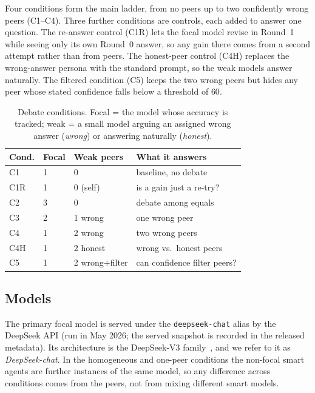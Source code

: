 \documentclass[11pt]{article}
\begin{document}
Four conditions form the main ladder, from no peers up to two confidently
wrong peers (C1--C4).
Three further conditions are controls, each added to answer one question.
The re-answer control (C1R) lets the focal model revise in Round~1 while
seeing only its own Round~0 answer, so any gain there comes from a second
attempt rather than from peers.
The honest-peer control (C4H) replaces the wrong-answer persona with the
standard prompt, so the weak models answer naturally.
The filtered condition (C5) keeps the two wrong peers but hides any peer
whose stated confidence falls below a threshold of $60$.

\begin{table}[t]
\centering
\small
\caption{Debate conditions. Focal = the model whose accuracy is tracked;
weak = a small model arguing an assigned wrong answer (\emph{wrong}) or
answering naturally (\emph{honest}).\label{tab:setup}}
\begin{tabular}{@{}llll@{}}
\toprule
Cond. & Focal & Weak peers & What it answers \\
\midrule
C1  & 1 & 0            & baseline, no debate \\
C1R & 1 & 0 (self)     & is a gain just a re-try? \\
C2  & 3 & 0            & debate among equals \\
C3  & 2 & 1 wrong      & one wrong peer \\
C4  & 1 & 2 wrong      & two wrong peers \\
C4H & 1 & 2 honest     & wrong vs.\ honest peers \\
C5  & 1 & 2 wrong$+$filter & can confidence filter peers? \\
\bottomrule
\end{tabular}
\end{table}

\subsection{Models}
\label{sub:models}

The primary focal model is served under the \texttt{deepseek-chat} alias
by the DeepSeek API (run in May 2026; the served snapshot is recorded in
the released metadata).
Its architecture is the DeepSeek-V3 family~\citep{deepseekai2024v3}, and we
refer to it as \textit{DeepSeek-chat}.
In the homogeneous and one-peer conditions the non-focal smart agents are
further instances of the same model, so any difference across conditions
comes from the peers, not from mixing different smart models.
\end{document}
